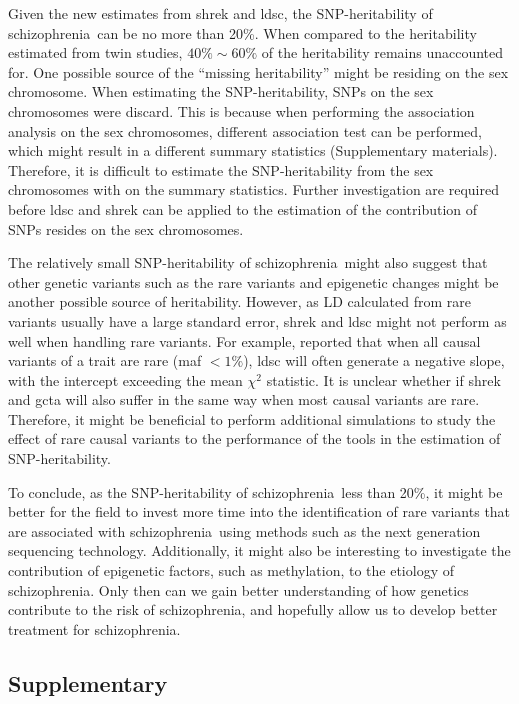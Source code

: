 \documentclass[12pt]{scrbook}
\newcommand*{\scz}{schizophrenia}
\begin{document}
Given the new estimates from \gls{shrek} and \gls{ldsc}, the \gls{SNP}-heritability of \scz\ can be no more than 20\%.
When compared to the heritability estimated from twin studies, $40\%\sim60\%$ of the heritability remains unaccounted for. 
One possible source of the ``missing heritability'' might be residing on the sex chromosome. 
When estimating the \gls{SNP}-heritability, \glspl{SNP} on the sex chromosomes were discard. 
This is because when performing the association analysis on the sex chromosomes, different association test can be performed, which might result in a different summary statistics \citep{Wong2014} (Supplementary materials).
Therefore, it is difficult to estimate the \gls{SNP}-heritability from the sex chromosomes with on the summary statistics.  
Further investigation are required before \gls{ldsc} and \gls{shrek} can be applied to the estimation of the contribution of \glspl{SNP} resides on the sex chromosomes.

The relatively small \gls{SNP}-heritability of \scz\ might also suggest that other genetic variants such as the rare variants and epigenetic changes might be another possible source of heritability.
However, as \gls{LD} calculated from rare variants usually have a large standard error, \gls{shrek} and \gls{ldsc} might not perform as well when handling rare variants. 
For example, \citet{Bulik-Sullivan2015} reported that when all causal variants of a trait are rare (\gls{maf} $<1\%$), \gls{ldsc} will often generate a negative slope, with the intercept exceeding the mean $\chi^2$ statistic.
It is unclear whether if \gls{shrek} and \gls{gcta} will also suffer in the same way when most causal variants are rare. 
Therefore, it might be beneficial to perform additional simulations to study the effect of rare causal variants to the performance of the tools in the estimation of \gls{SNP}-heritability. 

To conclude, as the \gls{SNP}-heritability of \scz\ less than 20\%, it might be better for the field to invest more time into the identification of rare variants that are associated with \scz\ using methods such as the next generation sequencing technology. 
Additionally, it might also be interesting to investigate the contribution of epigenetic factors, such as methylation, to the etiology of \scz.
Only then can we gain better understanding of how genetics contribute to the risk of \scz, and hopefully allow us to develop better treatment for \scz.

\newpage
\begin{singlespace}
	\section{Supplementary}
	
	
	
\end{singlespace}
\end{document}
